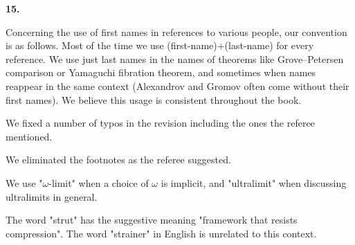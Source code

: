\documentclass[11pt]{amsart}
\begin{document}
{\bf 15.}

Concerning the use of first names in references to various people, our convention is as follows.
Most of the time we use (first-name)+(last-name) for every reference.
We use just last names  in the names of theorems like Grove--Petersen comparison or Yamaguchi fibration theorem,  and sometimes when names reappear in the same context (Alexandrov and Gromov often come without their first names).
We believe this usage is consistent throughout the book.

We fixed a number of typos in the revision including the ones the referee mentioned.

We eliminated the footnotes as the referee suggested.

We use "$\omega$-limit" when a choice of $\omega$ is implicit, and "ultralimit" when  discussing ultralimits in general.

The word "strut" has the suggestive meaning "framework that resists compression".
The word "strainer" in English is unrelated to this context.





 
\end{document}
